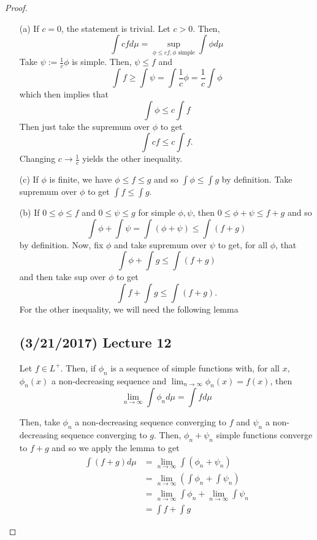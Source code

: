 \documentclass[11pt,leqno,oneside]{amsbook}
\numberwithin{thm}{section}
\begin{document}
\begin{proof}
  \begin{enumerate}
  \item[(a)] If $c=0$, the statement is trivial. Let $c > 0$. Then, \[
      \int c f d\mu = \sup_{\phi \leq cf, \phi \text{ simple}} \int
      \phi d\mu
    \]
    Take $\psi := \frac{1}{c}\phi$ is simple. Then, $\psi \leq f$
    and \[
      \int f \geq \int \psi = \int \frac{1}{c} \phi = \frac{1}{c} \int \phi
    \]
    which then implies that \[
      \int \phi \leq c \int f
    \]
    Then just take the supremum over $\phi$ to get \[
      \int cf \leq c \int f.
    \]
    Changing $c \to \frac{1}{c}$ yields the other inequality.
  \item[(c)] If $\phi$ is finite, we have $\phi \leq f \leq g$ and so
    $\int \phi \leq \int g$ by definition. Take supremum over $\phi$
    to get $\int f \leq \int g$.
  \item[(b)] If $0 \leq \phi \leq f$ and $0 \leq \psi \leq g$ for
    simple $\phi,\psi$, then $0 \leq \phi+\psi \leq f+g$ and so \[
      \int \phi + \int \psi = \int(\phi + \psi) \leq \int (f+g)
    \]
    by definition. Now, fix $\phi$ and take supremum over $\psi$ to
    get, for all $\phi$, that \[
      \int \phi + \int g \leq \int(f+g)
    \]
    and then take sup over $\phi$ to get \[
      \int f + \int g \leq \int(f+g).
    \]
    For the other inequality, we will need the following lemma
    \subsection*{(3/21/2017) Lecture 12}
    \begin{lem}\label{lem26}
  Let $f \in L^+$. Then, if $\phi_n$ is a sequence of simple functions
  with, for all $x$, $\phi_n(x)$ a non-decreasing sequence and
  $\lim_{n \to \infty} \phi_n(x) = f(x)$, then \[
    \lim_{n \to \infty} \int \phi_n d\mu = \int f d\mu
  \]
  \end{lem}
  Then, take $\phi_n$ a non-decreasing sequence converging to $f$ and
  $\psi_n$ a non-decreasing sequence converging to $g$. Then, $\phi_n
  + \psi_n$ simple functions converge to $f+g$ and so we apply the
  lemma to get
  \begin{align*}
    \int (f+g) d\mu & = \lim_{n \to \infty} \int (\phi_n+\psi_n) \\
                    & = \lim_{n \to \infty}\left( \int \phi_n + \int \psi_n \right)\\
    & = \lim_{n \to \infty} \int \phi_n + \lim_{n \to \infty} \int
      \psi_n \\
    & = \int f + \int g
  \end{align*}
  \end{enumerate}
\end{proof}
\end{document}
